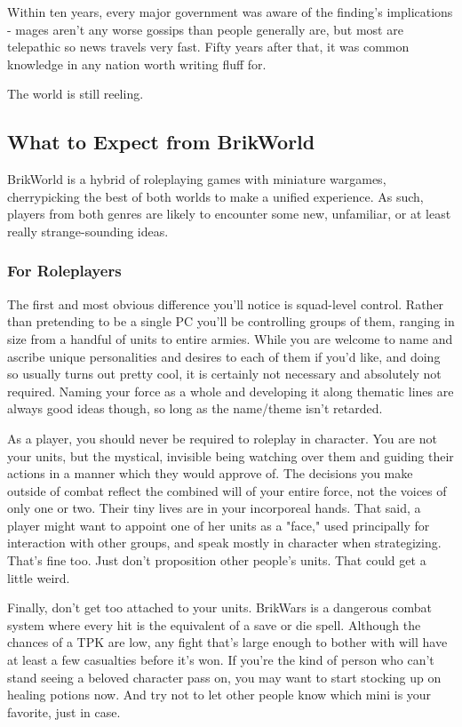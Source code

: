 \documentclass[12pt,a4paper,twocolumn]{article}
\begin{document}
Within ten years, every major government was aware of the finding's implications - mages aren't any worse gossips than people generally are, but most are telepathic so news travels very fast.  Fifty years after that, it was common knowledge in any nation worth writing fluff for.

The world is still reeling.
\subsection{What to Expect from BrikWorld}
BrikWorld is a hybrid of roleplaying games with miniature wargames, cherrypicking the best of both worlds to make a unified experience.  As such, players from both genres are likely to encounter some new, unfamiliar, or at least really strange-sounding ideas.

\subsubsection{For Roleplayers}
The first and most obvious difference you'll notice is squad-level control.  Rather than pretending to be a single PC you'll be controlling groups of them, ranging in size from a handful of units to entire armies.  While you are welcome to name and ascribe unique personalities and desires to each of them if you'd like, and doing so usually turns out pretty cool, it is certainly not necessary and absolutely not required.  Naming your force as a whole and developing it along thematic lines are always good ideas though, so long as the name/theme isn't retarded.

As a player, you should never be required to roleplay in character.  You are not your units, but the mystical, invisible being watching over them and guiding their actions in a manner which they would approve of.  The decisions you make outside of combat reflect the combined will of your entire force, not the voices of only one or two.  Their tiny lives are in your incorporeal hands.  That said, a player might want to appoint one of her units as a "face," used principally for interaction with other groups, and speak mostly in character when strategizing.  That's fine too.  Just don't proposition other people's units.  That could get a little weird.

Finally, don't get too attached to your units.  BrikWars is a dangerous combat system where every hit is the equivalent of a save or die spell.  Although the chances of a TPK are low, any fight that's large enough to bother with will have at least a few casualties before it's won.  If you're the kind of person who can't stand seeing a beloved character pass on, you may want to start stocking up on healing potions now.  And try not to let other people know which mini is your favorite, just in case.
\end{document}
